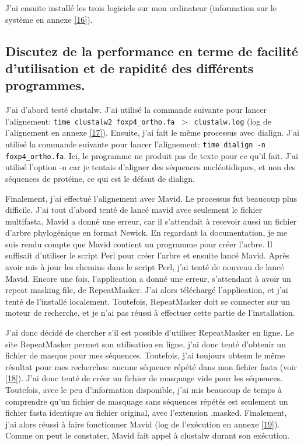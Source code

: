 \documentclass[10.8pt]{article} %
\begin{document}
J'ai ensuite installé les trois logiciels sur mon ordinateur (information sur le système en annexe \ref{16}).

\subsection[Facilité et rapidité des programmes]{Discutez de la performance en terme de facilité d'utilisation
et de rapidité des différents programmes.}

J'ai d'abord testé clustalw. J'ai utilisé la commande suivante pour lancer l'alignement: 
\texttt{time clustalw2 foxp4\_ortho.fa $>$ clustalw.log} (log de l'alignement en annexe \ref{17}). Ensuite,
j'ai fait le même processus avec dialign. J'ai utilisé la commande suivante pour lancer l'alignement:
\texttt{time dialign -n foxp4\_ortho.fa}. Ici, le programme ne produit pas de texte pour ce qu'il fait. J'ai
utilisé l'option -n car je tentais d'aligner des séquences nucléotidiques, et non des séquences de protéine,
ce qui est le défaut de dialign.

Finalement, j'ai effectué l'alignement avec Mavid. Le processus fut beaucoup plus difficile. J'ai tout d'abord
tenté de lancé mavid avec seulement le fichier multifasta. Mavid a donné une erreur, car il s'attendait à
recevoir aussi un fichier d'arbre phylogénique en format Newick. En regardant la documentation, je me
suis rendu compte que Mavid contient un programme pour créer l'arbre. Il suffisait d'utiliser le script
Perl pour créer l'arbre et ensuite lancé Mavid. Après avoir mis à jour les chemins dans le script Perl,
j'ai tenté de nouveau de lancé Mavid. Encore une fois, l'application a donné une erreur, s'attendant à
avoir un repeat masking file, de RepeatMasker. J'ai alors téléchargé l'application, et j'ai tenté de
l'installé localement. Toutefois, RepeatMasker doit se connecter sur un moteur de recherche, et je n'ai
pas réussi à effectuer cette partie de l'installation.

J'ai donc décidé de chercher s'il est possible d'utiliser RepeatMasker en ligne. Le site RepeatMasker permet
son utilisation en ligne, j'ai donc tenté d'obtenir un fichier de masque pour mes séquences. Toutefois, j'ai
toujours obtenu le même résultat pour mes recherches: aucune séquence répété dans mon fichier fasta (voir \ref{18}).
J'ai donc tenté de créer un fichier de masquage vide pour les séquences. Toutefois, avec le peu d'information disponible,
j'ai mis beaucoup de temps à comprendre qu'un fichier de masquage sans séquences répétés est seulement un fichier
fasta identique au fichier original, avec l'extension .masked. Finalement, j'ai alors réussi à faire fonctionner
Mavid (log de l'exécution en annexe \ref{19}). Comme on peut le constater, Mavid fait appel à clustalw durant son
exécution.
\end{document}
